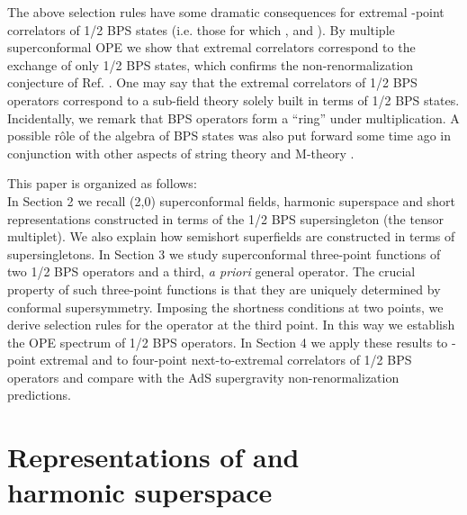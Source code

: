 \documentclass[a4paper,11pt]{article}
\begin{document}
The above selection rules have some dramatic consequences for
extremal \coordHE{}-point correlators of 1/2 BPS states (i.e. those for
which \coordHE{}, \coordHE{} and \coordHE{}).
By multiple superconformal OPE we show that extremal correlators
correspond to the exchange of only 1/2 BPS states, which confirms
the non-renormalization conjecture of Ref. \cite{DP}. One may say
that the extremal correlators of 1/2 BPS operators correspond to a
sub-field theory solely built in terms of 1/2 BPS states.
Incidentally, we remark that BPS operators form a ``ring'' under
multiplication. A possible r\^ole of the algebra of BPS states was
also put forward some time ago in conjunction with other
aspects of string theory and M-theory \cite{MH}.

This paper is organized as follows: \\ In Section 2 we recall \coordHE{} (2,0)
superconformal fields, harmonic superspace and short representations
constructed in terms of the 1/2 BPS supersingleton (the tensor multiplet). We
also explain how semishort superfields are constructed in terms of
supersingletons. In Section 3 we study superconformal three-point functions of
two 1/2 BPS operators and a third, {\it a priori} general operator. The crucial
property of such three-point functions is that they are uniquely determined by
conformal supersymmetry. Imposing the shortness conditions at two points, we
derive selection rules for the operator at the third point. In this way we
establish the OPE spectrum of 1/2 BPS operators. In Section 4 we apply these
results to \coordHE{}-point extremal and to four-point next-to-extremal correlators
of 1/2 BPS operators and compare with the AdS supergravity non-renormalization
predictions.





\section{Representations of \coordHE{} and \coordHE{}  \coordHE{} \\
harmonic superspace}
\end{document}
